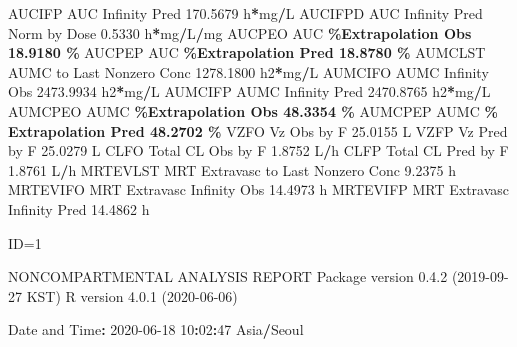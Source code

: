 \documentclass[
  10pt,
]{krantz}
\makeatletter
\newenvironment{Shaded}{\begin{snugshade}}{\end{snugshade}}
\newcommand{\DecValTok}[1]{\textcolor[rgb]{0.00,0.00,0.81}{#1}}
\newcommand{\FloatTok}[1]{\textcolor[rgb]{0.00,0.00,0.81}{#1}}
\newcommand{\NormalTok}[1]{#1}
\newcommand{\OperatorTok}[1]{\textcolor[rgb]{0.81,0.36,0.00}{\textbf{#1}}}
\newcommand{\StringTok}[1]{\textcolor[rgb]{0.31,0.60,0.02}{#1}}
\newenvironment{kframe}{%
\medskip{}
\setlength{\fboxsep}{.8em}
 \def\at@end@of@kframe{}%
 \ifinner\ifhmode%
  \def\at@end@of@kframe{\end{minipage}}%
  \begin{minipage}{\columnwidth}%
 \fi\fi%
 \def\FrameCommand##1{\hskip\@totalleftmargin \hskip-\fboxsep
 \colorbox{shadecolor}{##1}\hskip-\fboxsep
     \hskip-\linewidth \hskip-\@totalleftmargin \hskip\columnwidth}%
 \MakeFramed {\advance\hsize-\width
   \@totalleftmargin\z@ \linewidth\hsize
   \@setminipage}}%
 {\par\unskip\endMakeFramed%
 \at@end@of@kframe}
\renewenvironment{Shaded}{\begin{kframe}}{\end{kframe}}
\makeatother
\begin{document}
\begin{Shaded}
\begin{Highlighting}[]
\NormalTok{AUCIFP     AUC Infinity Pred                             }\FloatTok{170.5679}\NormalTok{ h}\OperatorTok{*}\NormalTok{mg}\OperatorTok{/}\NormalTok{L}
\NormalTok{AUCIFPD    AUC Infinity Pred Norm by Dose                  }\FloatTok{0.5330}\NormalTok{ h}\OperatorTok{*}\NormalTok{mg}\OperatorTok{/}\NormalTok{L}\OperatorTok{/}\NormalTok{mg}
\NormalTok{AUCPEO     AUC }\OperatorTok{\%Extrapolation Obs                         18.9180 \%}
\NormalTok{AUCPEP     AUC }\OperatorTok{\%Extrapolation Pred                        18.8780 \%}
\NormalTok{AUMCLST    AUMC to Last Nonzero Conc                    }\FloatTok{1278.1800}\NormalTok{ h2}\OperatorTok{*}\NormalTok{mg}\OperatorTok{/}\NormalTok{L}
\NormalTok{AUMCIFO    AUMC Infinity Obs                            }\FloatTok{2473.9934}\NormalTok{ h2}\OperatorTok{*}\NormalTok{mg}\OperatorTok{/}\NormalTok{L}
\NormalTok{AUMCIFP    AUMC Infinity Pred                           }\FloatTok{2470.8765}\NormalTok{ h2}\OperatorTok{*}\NormalTok{mg}\OperatorTok{/}\NormalTok{L}
\NormalTok{AUMCPEO    AUMC }\OperatorTok{\%Extrapolation Obs                        48.3354 \%}
\NormalTok{AUMCPEP    AUMC }\OperatorTok{\% Extrapolation Pred                      48.2702 \%}
\NormalTok{VZFO       Vz Obs by F                                    }\FloatTok{25.0155}\NormalTok{ L}
\NormalTok{VZFP       Vz Pred by F                                   }\FloatTok{25.0279}\NormalTok{ L}
\NormalTok{CLFO       Total CL Obs by F                               }\FloatTok{1.8752}\NormalTok{ L}\OperatorTok{/}\NormalTok{h}
\NormalTok{CLFP       Total CL Pred by F                              }\FloatTok{1.8761}\NormalTok{ L}\OperatorTok{/}\NormalTok{h}
\NormalTok{MRTEVLST   MRT Extravasc to Last Nonzero Conc              }\FloatTok{9.2375}\NormalTok{ h}
\NormalTok{MRTEVIFO   MRT Extravasc Infinity Obs                     }\FloatTok{14.4973}\NormalTok{ h}
\NormalTok{MRTEVIFP   MRT Extravasc Infinity Pred                    }\FloatTok{14.4862}\NormalTok{ h}





\NormalTok{ID=}\DecValTok{1}

\NormalTok{                        NONCOMPARTMENTAL ANALYSIS REPORT}
\NormalTok{                       Package version }\DecValTok{0}\NormalTok{.}\FloatTok{4.2}\NormalTok{ (}\DecValTok{2019{-}09{-}27}\NormalTok{ KST)}
\NormalTok{                          R version }\DecValTok{4}\NormalTok{.}\FloatTok{0.1}\NormalTok{ (}\DecValTok{2020{-}06{-}06}\NormalTok{)}

\NormalTok{Date and Time}\OperatorTok{:}\StringTok{ }\DecValTok{2020{-}06{-}18} \DecValTok{10}\OperatorTok{:}\DecValTok{02}\OperatorTok{:}\DecValTok{47}\NormalTok{ Asia}\OperatorTok{/}\NormalTok{Seoul}


\end{Highlighting}
\end{Shaded}
\end{document}
